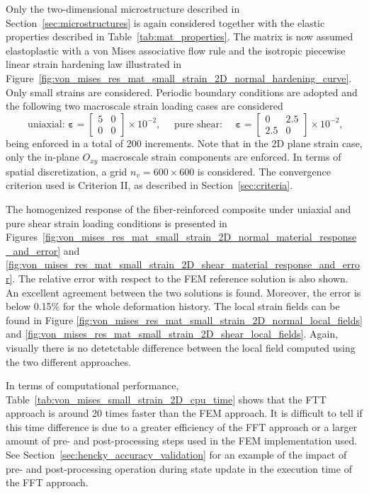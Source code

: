 Only the two-dimensional microstructure described in Section~\ref{sec:microstructures} is again considered together with the elastic properties described in Table~\ref{tab:mat_properties}.
The matrix is now assumed elastoplastic with a von Mises associative flow rule and the isotropic piecewise linear strain hardening law illustrated in Figure~\ref{fig:von_mises_res_mat_small_strain_2D_normal_hardening_curve}.
Only small strains are considered.
Periodic boundary conditions are adopted and the following two macroscale strain loading cases are considered
\begin{equation}
\text { uniaxial: } \bm{\varepsilon}=\left[\begin{array}{cc}
5 & 0 \\
0 & 0
\end{array}\right] \times 10^{-2}, \quad \text { pure shear: } \quad \bm \varepsilon=\left[\begin{array}{cc}
0 & 2.5 \\
2.5 & 0
\end{array}\right] \times 10^{-2},
\end{equation}
being enforced in a total of 200 increments.
Note that in the 2D plane strain case, only the in-plane \(O_{x y}\) macroscale strain components are enforced.
In terms of spatial discretization, a grid \(n_{v}=600 \times 600\) is considered.
The convergence criterion used is Criterion II, as described in Section~\ref{sec:criteria}.

The homogenized response of the fiber-reinforced composite under uniaxial and pure shear strain loading conditions is presented in Figures~\ref{fig:von_mises_res_mat_small_strain_2D_normal_material_response_and_error} and \ref{fig:von_mises_res_mat_small_strain_2D_shear_material_response_and_error}.
The relative error with respect to the FEM reference solution is also shown.
An excellent agreement between the two solutions is found.
Moreover, the error is below 0.15\% for the whole deformation history.
The local strain fields can be found in Figure \ref{fig:von_mises_res_mat_small_strain_2D_normal_local_fields} and \ref{fig:von_mises_res_mat_small_strain_2D_shear_local_fields}.
Again, visually there is no detetctable difference between the local field computed using the two different approaches.

In terms of computational performance, Table~\ref{tab:von_mises_small_strain_2D_cpu_time} shows that the FTT approach is around 20 times faster than the FEM approach.
It is difficult to tell if this time difference is due to a greater efficiency of the FFT approach or a larger amount of pre- and post-processing steps used in the FEM implementation used.
See Section~\ref{sec:hencky_accuracy_validation} for an example of the impact of pre- and post-processing operation during state update in the execution time of the FFT approach.


